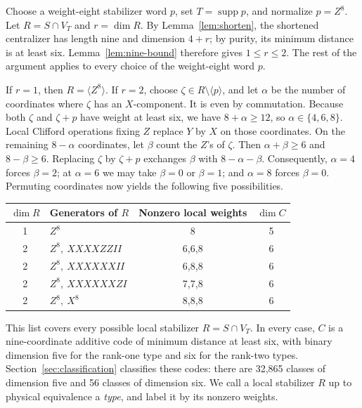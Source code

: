 \documentclass[11pt]{article}
\theoremstyle{definition}
\theoremstyle{remark}
\begin{document}
Choose a weight-eight stabilizer word \(p\), set
\(T=\operatorname{supp}p\), and normalize \(p=Z^8\). Let \(R=S\cap V_T\)
and \(r=\dim R\). By Lemma~\ref{lem:shorten}, the shortened centralizer
has length nine and dimension \(4+r\); by purity, its minimum distance
is at least six. Lemma~\ref{lem:nine-bound} therefore gives
\(1\leq r\leq2\). The rest of the argument applies to every choice of
the weight-eight word \(p\).

If \(r=1\), then \(R=\langle Z^8\rangle\). If \(r=2\), choose
\(\zeta\in R\setminus\langle p\rangle\), and let \(\alpha\) be the
number of coordinates where \(\zeta\) has an \(X\)-component. It is even
by commutation. Because both \(\zeta\) and \(\zeta+p\) have weight at
least six, we have \(8+\alpha\geq12\), so \(\alpha\in\{4,6,8\}\). Local
Clifford operations fixing \(Z\) replace \(Y\) by \(X\) on those coordinates. On
the remaining \(8-\alpha\) coordinates, let \(\beta\) count the \(Z\)'s
of \(\zeta\). Then \(\alpha+\beta\geq6\) and \(8-\beta\geq6\).
Replacing \(\zeta\) by \(\zeta+p\) exchanges \(\beta\) with
\(8-\alpha-\beta\). Consequently, \(\alpha=4\) forces \(\beta=2\); at
\(\alpha=6\) we may take \(\beta=0\) or \(\beta=1\); and \(\alpha=8\) forces
\(\beta=0\). Permuting coordinates now yields the following five
possibilities.

\begin{center}
\begin{tabular}{@{}clcc@{}}\toprule
\(\dim R\)&Generators of \(R\)&Nonzero local weights&\(\dim C\)\\\midrule
1&\(Z^8\)&8&5\\
2&\(Z^8,\ XXXXZZII\)&6,6,8&6\\
2&\(Z^8,\ XXXXXXII\)&6,8,8&6\\
2&\(Z^8,\ XXXXXXZI\)&7,7,8&6\\
2&\(Z^8,\ X^8\)&8,8,8&6\\\bottomrule
\end{tabular}
\end{center}

This list covers every possible local stabilizer \(R=S\cap V_T\). In
every case, \(C\) is a nine-coordinate additive code of minimum distance
at least six, with binary dimension five for the rank-one type and six
for the rank-two types. Section~\ref{sec:classification} classifies these
codes: there are 32,865 classes of dimension five and 56 classes of
dimension six. We call a local stabilizer \(R\) up to physical
equivalence a \emph{type}, and label it by its nonzero weights.
\end{document}
